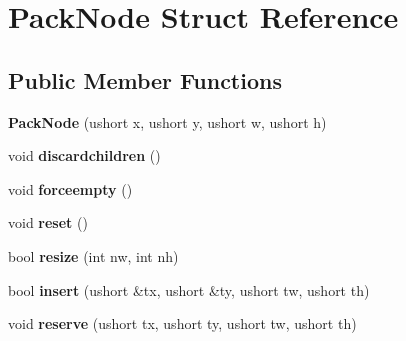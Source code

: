 \hypertarget{struct_pack_node}{}\section{Pack\+Node Struct Reference}
\label{struct_pack_node}
\subsection*{Public Member Functions}
\begin{DoxyCompactItemize}
\item 
\mbox{\label{struct_pack_node_a797b6108625a91ede8964be868ff6caa}} 
{\bfseries Pack\+Node} (ushort x, ushort y, ushort w, ushort h)
\item 
\mbox{\label{struct_pack_node_a20898030aebd7b69e8d4edd075635640}} 
void {\bfseries discardchildren} ()
\item 
\mbox{\label{struct_pack_node_ae4ee7163b29ffb2433d162c149e6dcd4}} 
void {\bfseries forceempty} ()
\item 
\mbox{\label{struct_pack_node_a6bd1d6ed96deb09008c3f3ed804325e4}} 
void {\bfseries reset} ()
\item 
\mbox{\label{struct_pack_node_a0bba40a1fc318a8b00d2a526ad734d6e}} 
bool {\bfseries resize} (int nw, int nh)
\item 
\mbox{\label{struct_pack_node_a9cad9f74f3ea88f245e9224435d495a0}} 
bool {\bfseries insert} (ushort \&tx, ushort \&ty, ushort tw, ushort th)
\item 
\mbox{\label{struct_pack_node_a6689dcddecdf85e766f943ac98fd6d10}} 
void {\bfseries reserve} (ushort tx, ushort ty, ushort tw, ushort th)
\end{DoxyCompactItemize}
